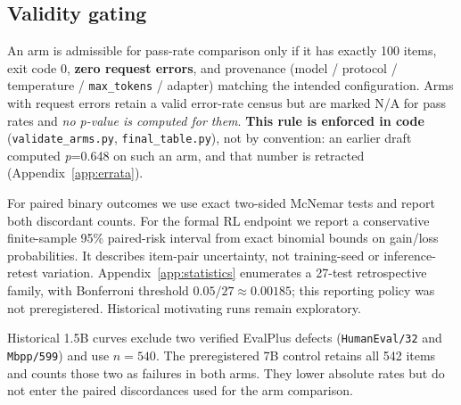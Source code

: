 \subsection{Validity gating}
\label{sec:gating}

An arm is admissible for pass-rate comparison only if it has exactly 100 items, exit code 0,
\textbf{zero request errors}, and provenance (model / protocol / temperature /
\texttt{max\_tokens} / adapter) matching the intended configuration. Arms with request errors
retain a valid error-rate census but are marked N/A for pass rates and \emph{no
p-value is computed for them}. \textbf{This rule is enforced in code}
(\texttt{validate\_arms.py}, \texttt{final\_table.py}), not by convention: an earlier draft
computed \emph{p}=0.648 on such an arm, and that number is retracted
(Appendix~\ref{app:errata}).

For paired binary outcomes we use exact two-sided McNemar tests and report both discordant counts.
For the formal RL endpoint we report a conservative finite-sample 95\% paired-risk interval
from exact binomial bounds on gain/loss probabilities. It describes item-pair uncertainty,
not training-seed or inference-retest variation. Appendix~\ref{app:statistics} enumerates a
27-test retrospective family, with Bonferroni threshold $0.05/27\approx0.00185$; this reporting
policy was not preregistered. Historical motivating runs remain exploratory.

Historical 1.5B curves exclude two verified EvalPlus defects (\texttt{HumanEval/32} and
\texttt{Mbpp/599}) and use $n=540$. The preregistered 7B control retains all 542 items and counts
those two as failures in both arms. They lower absolute rates but do not enter the paired
discordances used for the arm comparison.
